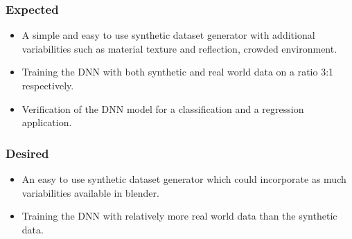 \documentclass[rnd]{mas_proposal}
\begin{document}
\subsubsection*{Expected}
\begin{itemize}
    \item A simple and easy to use synthetic dataset generator with additional variabilities such as material texture and reflection, crowded environment.
    \item Training the DNN with both synthetic and real world data on a ratio 3:1 respectively.
    \item Verification of the DNN model for a classification and a regression application.
\end{itemize}

\subsubsection*{Desired}
\begin{itemize}
    \item An easy to use synthetic dataset generator which could incorporate as much variabilities available in blender.
    \item Training the DNN with relatively more real world data than the synthetic data.
\end{itemize}


\nocite{*}

\end{document}
